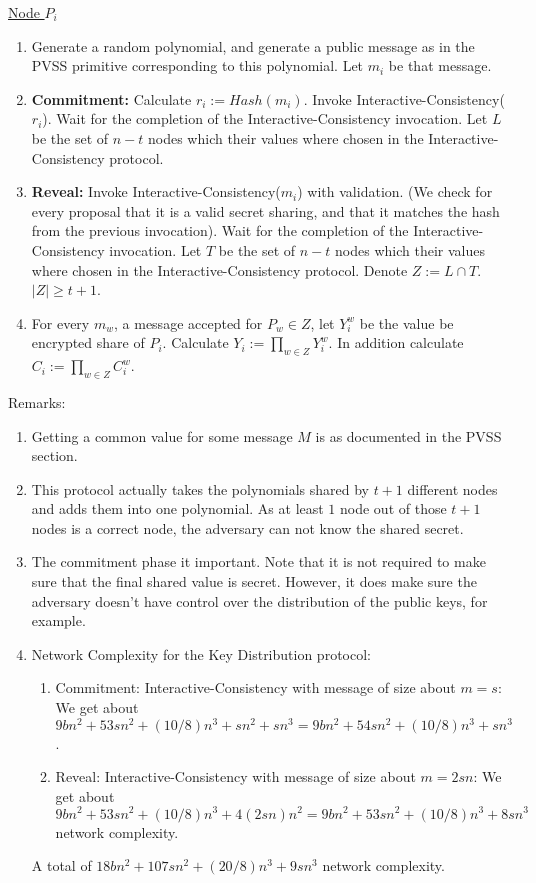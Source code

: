 \uline{Node $P_i$}
\begin{enumerate}
  \item Generate a random polynomial, and generate a public message as in the
    PVSS primitive corresponding to this polynomial. Let $m_i$ be that message.
  \item \textbf{Commitment:} Calculate $r_i := Hash(m_i)$. Invoke
    Interactive-Consistency($r_i$).  Wait for the completion of the
    Interactive-Consistency invocation. Let $L$ be the set of $n-t$ nodes which
    their values where chosen in the Interactive-Consistency protocol.
  \item \textbf{Reveal:} Invoke Interactive-Consistency($m_i$) with validation.
    (We check for every proposal that it is a valid secret sharing, and that it
    matches the hash from the previous invocation). Wait for the completion of
    the Interactive-Consistency invocation. Let $T$ be the set of $n-t$ nodes
    which their values where chosen in the Interactive-Consistency protocol.
    Denote $Z := L \cap T$. $|Z| \geq t+1$.
  \item For every $m_w$, a message accepted for $P_w \in Z$, let $Y_i^w$ be the
    value be encrypted share of $P_i$. Calculate $Y_i := {\prod}_{w \in
    Z}{Y_i^w}$. In addition calculate $C_i := {\prod}_{w \in Z}{C_i^w}$.
\end{enumerate}

Remarks:
\begin{enumerate}
  \item Getting a common value for some message $M$ is as documented in the PVSS
    section.
  \item This protocol actually takes the polynomials shared by $t+1$ different
    nodes and adds them into one polynomial. As at least $1$ node out of those
    $t+1$ nodes is a correct node, the adversary can not know the shared secret.
  \item The commitment phase it important. Note that it is not required to make
    sure that the final shared value is secret. However, it does make sure the
    adversary doesn't have control over the distribution of the public keys, for
    example.
  \item Network Complexity for the Key Distribution protocol:
    \begin{enumerate}
      \item Commitment: Interactive-Consistency with message of size about $m =
        s$: We get about $9bn^2 + 53sn^2 + (10/8){n^3} + sn^2 + sn^3 = 9bn^2 +
        54sn^2 + (10/8){n^3} + sn^3$.
      \item Reveal: Interactive-Consistency with message of size about $m =
        2sn$: We get about $9bn^2 + 53sn^2 + (10/8){n^3} + 4(2sn)n^2 = 9bn^2 +
        53sn^2 + (10/8){n^3} + 8sn^3$ network complexity.
    \end{enumerate}
    A total of $18bn^2 + 107sn^2 + (20/8){n^3} + 9sn^3$ network complexity.
\end{enumerate}

